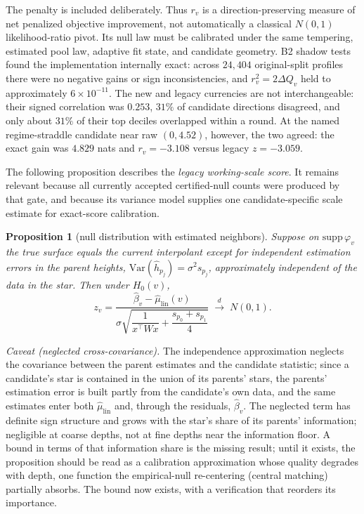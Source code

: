 \documentclass[11pt]{article}
\newtheorem{proposition}{Proposition}[section]
\newcommand{\Var}{\mathrm{Var}}
\begin{document}
The penalty is included deliberately. Thus $r_v$ is a direction-preserving measure of net
penalized objective improvement, not automatically a classical $N(0,1)$ likelihood-ratio pivot. Its
null law must be calibrated under the same tempering, estimated pool law, adaptive fit state, and
candidate geometry. B2 shadow tests found the implementation internally exact: across $24{,}404$
original-split profiles there were no negative gains or sign inconsistencies, and
$r_v^2=2\Delta Q_v$ held to approximately $6\times10^{-11}$. The new and legacy currencies are not
interchangeable: their signed correlation was $0.253$, $31\%$ of candidate directions disagreed,
and only about $31\%$ of their top deciles overlapped within a round. At the named regime-straddle
candidate near raw $(0,4.52)$, however, the two agreed: the exact gain was $4.829$ nats and
$r_v=-3.108$ versus legacy $z=-3.059$.

The following proposition describes the \emph{legacy working-scale score}. It remains relevant
because all currently accepted certified-null counts were produced by that gate, and because its
variance model supplies one candidate-specific scale estimate for exact-score calibration.

\begin{proposition}[null distribution with estimated neighbors]\label{prop:null}
Suppose on $\mathrm{supp}\,\varphi_v$ the true surface equals the current interpolant
except for independent estimation errors in the parent heights,
$\Var(\hat h_{p_j})=\sigma^2 s_{p_j}$, approximately independent of the data in the
star. Then under $H_0(v)$,
\begin{equation}\label{eq:z}
z_v=\frac{\hat\beta_v-\hat\mu_{\mathrm{lin}}(v)}
{\sigma\sqrt{\dfrac{1}{x^\top Wx}+\dfrac{s_{p_0}+s_{p_1}}{4}}}
\;\xrightarrow{\ d\ }\;N(0,1).
\end{equation}
\end{proposition}

\emph{Caveat (neglected cross-covariance).} The independence approximation
neglects the covariance between the parent estimates and the candidate
statistic; since a candidate's star is contained in the union of its parents'
stars, the parents' estimation error is built partly from the candidate's own
data, and the same estimates enter both $\hat\mu_{\mathrm{lin}}$ and, through
the residuals, $\hat\beta_v$. The neglected term has definite sign structure
and grows with the star's share of its parents' information; negligible at
coarse depths, not at fine depths near the information floor. A bound in
terms of that information share is the missing result; until it exists, the
proposition should be read as a calibration approximation whose quality
degrades with depth, one function the empirical-null re-centering (central
matching) partially absorbs. The bound now exists, with a verification that
reorders its importance.
\end{document}
